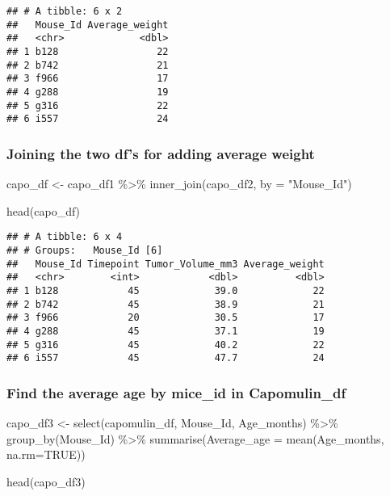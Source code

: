 \documentclass[
]{article}
\newenvironment{Shaded}{\begin{snugshade}}{\end{snugshade}}
\newcommand{\AttributeTok}[1]{\textcolor[rgb]{0.77,0.63,0.00}{#1}}
\newcommand{\ConstantTok}[1]{\textcolor[rgb]{0.00,0.00,0.00}{#1}}
\newcommand{\FunctionTok}[1]{\textcolor[rgb]{0.00,0.00,0.00}{#1}}
\newcommand{\NormalTok}[1]{#1}
\newcommand{\OtherTok}[1]{\textcolor[rgb]{0.56,0.35,0.01}{#1}}
\newcommand{\SpecialCharTok}[1]{\textcolor[rgb]{0.00,0.00,0.00}{#1}}
\newcommand{\StringTok}[1]{\textcolor[rgb]{0.31,0.60,0.02}{#1}}
\begin{document}
\begin{verbatim}
## # A tibble: 6 x 2
##   Mouse_Id Average_weight
##   <chr>             <dbl>
## 1 b128                 22
## 2 b742                 21
## 3 f966                 17
## 4 g288                 19
## 5 g316                 22
## 6 i557                 24
\end{verbatim}

\hypertarget{joining-the-two-dfs-for-adding-average-weight}{%
\subsubsection{Joining the two df's for adding average
weight}\label{joining-the-two-dfs-for-adding-average-weight}}

\begin{Shaded}
\begin{Highlighting}[]
\NormalTok{capo\_df }\OtherTok{\textless{}{-}}\NormalTok{ capo\_df1 }\SpecialCharTok{\%\textgreater{}\%} \FunctionTok{inner\_join}\NormalTok{(capo\_df2, }\AttributeTok{by =} \StringTok{"Mouse\_Id"}\NormalTok{)}

\FunctionTok{head}\NormalTok{(capo\_df)}
\end{Highlighting}
\end{Shaded}

\begin{verbatim}
## # A tibble: 6 x 4
## # Groups:   Mouse_Id [6]
##   Mouse_Id Timepoint Tumor_Volume_mm3 Average_weight
##   <chr>        <int>            <dbl>          <dbl>
## 1 b128            45             39.0             22
## 2 b742            45             38.9             21
## 3 f966            20             30.5             17
## 4 g288            45             37.1             19
## 5 g316            45             40.2             22
## 6 i557            45             47.7             24
\end{verbatim}

\hypertarget{find-the-average-age-by-mice_id-in-capomulin_df}{%
\subsubsection{Find the average age by mice\_id in
Capomulin\_df}\label{find-the-average-age-by-mice_id-in-capomulin_df}}

\begin{Shaded}
\begin{Highlighting}[]
\NormalTok{capo\_df3 }\OtherTok{\textless{}{-}} \FunctionTok{select}\NormalTok{(capomulin\_df, Mouse\_Id, Age\_months) }\SpecialCharTok{\%\textgreater{}\%}
  \FunctionTok{group\_by}\NormalTok{(Mouse\_Id) }\SpecialCharTok{\%\textgreater{}\%}
 \FunctionTok{summarise}\NormalTok{(}\AttributeTok{Average\_age =} \FunctionTok{mean}\NormalTok{(Age\_months, }\AttributeTok{na.rm=}\ConstantTok{TRUE}\NormalTok{))}

\FunctionTok{head}\NormalTok{(capo\_df3)}
\end{Highlighting}
\end{Shaded}
\end{document}
